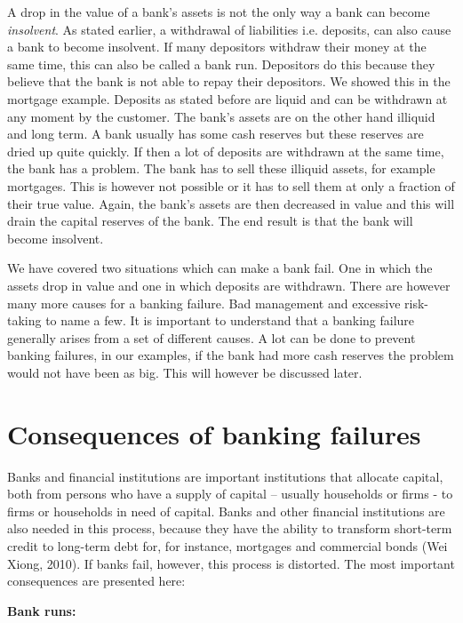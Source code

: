 \documentclass[DIV=calc, paper=a4, fontsize=11pt, twocolumn]{scrartcl}	 %
\begin{document}
A drop in the value of a bank's assets is not the only way a bank can become \textit{insolvent}. As stated earlier, a withdrawal of liabilities i.e. deposits, can also cause a bank to become insolvent. If many depositors withdraw their money at the same time, this can also be called a bank run. Depositors do this because they believe that the bank is not able to repay their depositors. We showed this in the mortgage example. Deposits as stated before are liquid and can be withdrawn at any moment by the customer. The bank's assets are on the other hand illiquid and long term. A bank usually has some cash reserves but these reserves are dried up quite quickly. If then a lot of deposits are withdrawn at the same time, the bank has a problem. The bank has to sell these illiquid assets, for example mortgages. This is however not possible or it has to sell them at only a fraction of their true value. Again, the bank's assets are then decreased in value and this will drain the capital reserves of the bank. The end result is that the bank will become insolvent.

We have covered two situations which can make a bank fail. One in which the assets drop in value and one in which deposits are withdrawn. There are however many more causes for a banking failure. Bad management and excessive risk-taking to name a few. It is important to understand that a banking failure generally arises from a set of different causes. A lot can be done to prevent banking failures, in our examples, if the bank had more cash reserves the problem would not have been as big. This will however be discussed later.

\section*{Consequences of banking failures}
Banks and financial institutions are important institutions that allocate capital, both from persons who have a supply of capital – usually households or firms -  to firms or households in need of capital. Banks and other financial institutions are also needed in this process, because they have the ability to transform short-term credit to long-term debt for, for instance, mortgages and commercial bonds (Wei Xiong, 2010). If banks fail, however, this process is distorted. The most important consequences are presented here: 

\textbf{Bank runs:}
\end{document}
